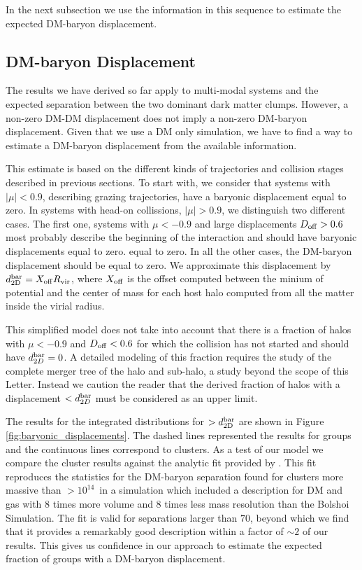 \documentclass{emulateapj}
\newcommand{\hkpc}{{\ifmmode{h^{-1}{\rm kpc}}\else{$h^{-1}$kpc }\fi}}
\newcommand{\hMsun}{{\ifmmode{h^{-1}{\rm {M_{\odot}}}}\else{$h^{-1}{\rm{M_{\odot}}}$}\fi}}
\begin{document}
In the next subsection we use the information in this sequence to
estimate the expected DM-baryon displacement. 



\subsection{DM-baryon Displacement}
\label{sec:baryonic_displacements}

The results we have derived so far apply to multi-modal systems and
the expected separation between the two dominant dark matter
clumps. However, a non-zero DM-DM displacement does not imply 
a non-zero DM-baryon displacement. Given that we use a DM only
simulation, we have to find a way to estimate a DM-baryon displacement
from the available information.  

This estimate is based on the different kinds of trajectories and
collision stages described in previous sections. To start with, we
consider that systems with $|\mu|<0.9$, describing grazing
trajectories, have a baryonic displacement equal to zero.  In systems
with head-on collissions, $|\mu|>0.9$, we distinguish two different
cases. The first one, systems with  $\mu<-0.9$ and large displacements $D_{\rm
  off}>0.6$ most probably describe the beginning of the interaction
and should have baryonic displacements equal to zero.
equal to zero. In all the other cases, the DM-baryon displacement
should be equal to zero. We approximate this displacement by  $d_{\rm
  2D}^{\rm bar} = X_{\rm off} R_{\rm   vir}$, where $X_{\rm   off}$ is
the offset computed between the minium of potential and the center of
mass for each host halo computed from all the matter inside the virial
radius.  


This simplified model does not take into account that there is a
fraction of halos with $\mu<-0.9$ and $D_{\rm off}<0.6$ for which the
collision has not started and should have $d_{2D}^{\rm bar}=0$. A detailed
modeling of this fraction requires the study of the complete merger
tree of the halo and sub-halo, a study beyond the scope of this
Letter. Instead we caution the reader that the derived fraction of
halos with a displacement $<d_{2D}^{\rm bar}$ must be considered as an
upper limit. 

The results for the integrated distributions for $>d_{\rm 2D}^{\rm bar}$
are shown in Figure \ref{fig:baryonic_displacements}. The dashed lines
represented the results for groups and the continuous lines correspond
to clusters. As a test of our model we compare the cluster results
against the analytic fit provided by \cite{ForeroRomero2010}. This fit
reproduces the statistics for the DM-baryon separation found for
clusters more massive than $>10^{14}$\hMsun\ in a simulation
which included a description for DM and gas with $8$ times more volume
and $8$ times less mass resolution than the Bolshoi Simulation. The
fit is valid for separations larger than $70$\hkpc, beyond which we
find that it provides a remarkably good description within a factor of
$\sim 2$ of our results. This gives us confidence in our approach to
estimate the expected fraction of groups with a DM-baryon
displacement. 
\end{document}
